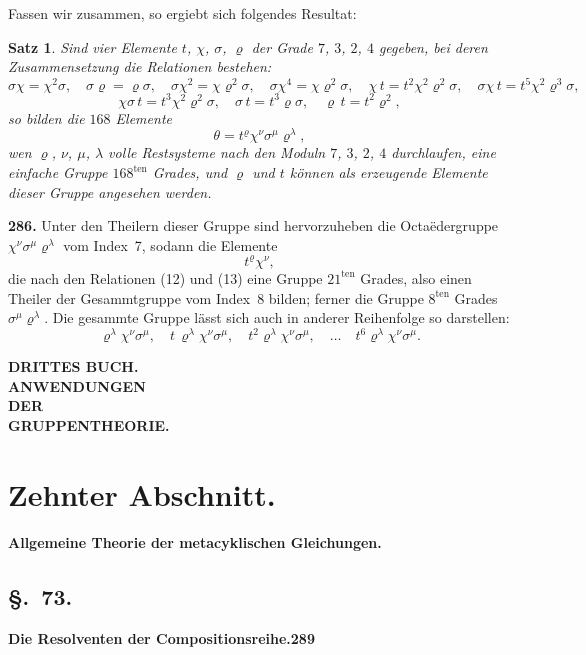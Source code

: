 \documentclass[12pt,a4paper]{article}
\newtheorem*{satz}{Satz}
\begin{document}
Fassen wir zusammen, so ergiebt sich folgendes Resultat:

\begin{satz}
Sind vier Elemente $t$, $\chi$, $\sigma$, $\varrho$ der Grade $7$, $3$, $2$, $4$ gegeben, bei deren Zusammensetzung die Relationen bestehen:
\[
\sigma\chi = \chi^2\sigma,\quad \sigma\varrho = \varrho\sigma,\quad \sigma\chi^2 = \chi\varrho^2\sigma,\quad
\sigma\chi^4 = \chi\varrho^2\sigma,\quad \chi\,t = t^2\chi^2\varrho^2\sigma,\quad \sigma\chi\,t = t^5\chi^2\varrho^3\sigma,
\]
\[
\chi\sigma\,t = t^3\chi^2\varrho^2\sigma,\quad \sigma\,t = t^3\varrho\sigma,\quad \varrho\,t = t^2\varrho^2,
\]
so bilden die $168$ Elemente
\[
\theta = t^{\varrho}\chi^{\nu}\sigma^{\mu}\varrho^{\lambda},
\]
wen $\varrho$, $\nu$, $\mu$, $\lambda$ volle Restsysteme nach den Moduln $7$, $3$, $2$, $4$ durchlaufen, eine einfache Gruppe $168^{\text{ten}}$ Grades, und $\varrho$ und $t$ k\"onnen als erzeugende Elemente dieser Gruppe angesehen werden.
\end{satz}

\bigskip
\noindent\textbf{286.} Unter den Theilern dieser Gruppe sind hervorzuheben die Octa\"edergruppe $\chi^{\nu}\sigma^{\mu}\varrho^{\lambda}$ vom Index~7, sodann die Elemente
\[
t^{\varrho}\chi^{\nu},
\]
die nach den Relationen (12) und (13) eine Gruppe $21^{\text{ten}}$ Grades, also einen Theiler der Gesammtgruppe vom Index~8 bilden; ferner die Gruppe $8^{\text{ten}}$ Grades $\sigma^{\mu}\varrho^{\lambda}$. Die gesammte Gruppe l\"asst sich auch in anderer Reihenfolge so darstellen:
\[
\varrho^{\lambda}\chi^{\nu}\sigma^{\mu},\quad t\,\varrho^{\lambda}\chi^{\nu}\sigma^{\mu},\quad t^2\varrho^{\lambda}\chi^{\nu}\sigma^{\mu},\quad\ldots\quad t^6\varrho^{\lambda}\chi^{\nu}\sigma^{\mu}.
\]

\newpage
\begin{center}
\Large\textbf{DRITTES BUCH.}\\[12pt]
\textbf{ANWENDUNGEN}\\[4pt]
\textbf{DER}\\[4pt]
\textbf{GRUPPENTHEORIE.}
\end{center}

\newpage
\section*{Zehnter Abschnitt.}
\textbf{Allgemeine Theorie der metacyklischen Gleichungen.}

\subsection*{\S.~73.}
\textbf{Die Resolventen der Compositionsreihe.}\hfill\textbf{289}\\[4pt]
\end{document}
